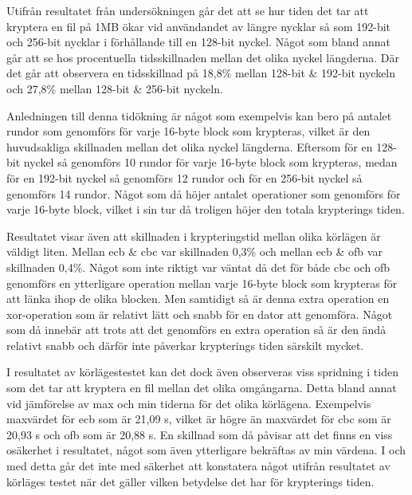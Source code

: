 \label{chap:discussion}

Utifrån resultatet från undersökningen går det att se hur tiden det tar att kryptera en fil på 1MB ökar vid användandet av längre nycklar så som 192-\gls{bit} och 256-\gls{bit} nycklar
i förhållande till en 128-\gls{bit} nyckel. Något som bland annat går att se hos procentuella tidsskillnaden mellan det olika nyckel längderna. Där det går att observera en
tidsskillnad på 18,8\% mellan 128-\gls{bit} \& 192-\gls{bit} nyckeln och 27,8\% mellan 128-\gls{bit} \& 256-\gls{bit} nyckeln.

Anledningen till denna tidökning är något som exempelvis kan bero på antalet rundor som genomförs för varje 16-\gls{byte} block som krypteras, vilket är den huvudsakliga
skillnaden mellan det olika nyckel längderna. Eftersom för en 128-\gls{bit} nyckel så genomförs 10 rundor för varje 16-\gls{byte} block som krypteras, medan för en 192-\gls{bit}
nyckel så genomförs 12 rundor och för en 256-\gls{bit} nyckel så genomförs 14 rundor. Något som då höjer antalet operationer som genomförs för varje 16-\gls{byte} block, vilket
i sin tur då troligen höjer den totala krypterings tiden.

Resultatet visar även att skillnaden i krypteringstid mellan olika körlägen är väldigt liten. Mellan \acrshort{ecb} \& \acrshort{cbc} var skillnaden 0,3\% och mellan \acrshort{ecb}
\& \acrshort{ofb} var skillnaden 0,4\%. Något som inte riktigt var väntat då det för både \acrshort{cbc} och \acrshort{ofb}
genomförs en ytterligare operation mellan varje 16-\gls{byte} block som krypteras för att länka ihop de olika blocken. Men samtidigt så är denna extra operation en \gls{xor}-operation
som är relativt lätt och snabb för en dator att genomföra. Något som då innebär att trots att det genomförs en extra operation så är den ändå relativt snabb och därför inte
påverkar krypterings tiden särskilt mycket.

I resultatet av körlägestestet kan det dock även observeras viss spridning i tiden som det tar att kryptera en fil mellan det olika omgångarna. Detta bland annat vid jämförelse av
max och min tiderna för det olika körlägena. Exempelvis maxvärdet för \acrshort{ecb} som är 21,09 s, vilket är högre än
maxvärdet för \acrshort{cbc} som är 20,93 s och \acrshort{ofb} som är 20,88 s. En skillnad som då påvisar att det finns en viss osäkerhet i
resultatet, något som även ytterligare bekräftas av min värdena. I och med detta går det inte med säkerhet att konstatera något utifrån resultatet av körläges testet
när det gäller vilken betydelse det har för krypterings tiden.

